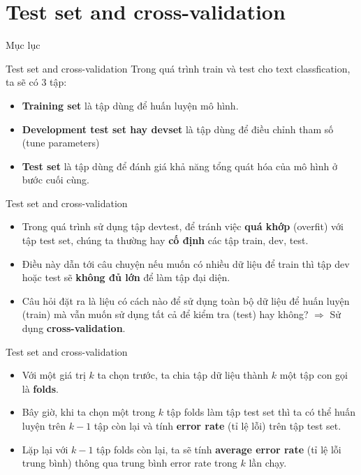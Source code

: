 \section{Test set and cross-validation}
\begin{frame}{Mục lục}
	\tableofcontents[currentsection]
\end{frame}

\begin{frame}{Test set and cross-validation}
	Trong quá trình train và test cho text classfication, ta sẽ có 3 tập: 
	\begin{itemize}
		\item \textbf{Training set} là tập dùng để huấn luyện mô hình.
		\item \textbf{Development test set hay devset} là tập dùng để điều chỉnh tham số (tune parameters)
		\item \textbf{Test set} là tập dùng để đánh giá khả năng tổng quát hóa của mô hình ở bước cuối cùng.
	\end{itemize}
\end{frame}

\begin{frame}{Test set and cross-validation}
	\begin{itemize}
		\item Trong quá trình sử dụng tập devtest, để tránh việc \textbf{quá khớp} (overfit) với tập test set, chúng ta thường hay \textbf{cố định} các tập train, dev, test.
		\item Điều này dẫn tới câu chuyện nếu muốn có nhiều dữ liệu để train thì tập dev hoặc test sẽ \textbf{không đủ lớn} để làm tập đại diện.
		\item Câu hỏi đặt ra là liệu có cách nào để sử dụng toàn bộ dữ liệu để huấn luyện (train) mà vẫn muốn sử dụng tất cả để kiểm tra (test) hay không? 
		\pause
		$\Rightarrow$ Sử dụng \textbf{cross-validation}.
	\end{itemize}
\end{frame}

\begin{frame}{Test set and cross-validation}
	\begin{itemize}
		\item Với một giá trị $k$ ta chọn trước, ta chia tập dữ liệu thành $k$ một tập con gọi là \textbf{folds}. 
		\item Bây giờ, khi ta chọn một trong $k$ tập folds làm tập test set thì ta có thể huấn luyện trên $k-1$ tập còn lại và tính \textbf{error rate} (tỉ lệ lỗi) trên tập test set. 
		\item Lặp lại với $k-1$ tập folds còn lại, ta sẽ tính \textbf{average error rate} (tỉ lệ lỗi trung bình) thông qua trung bình error rate trong $k$ lần chạy.
	\end{itemize}
\end{frame}

